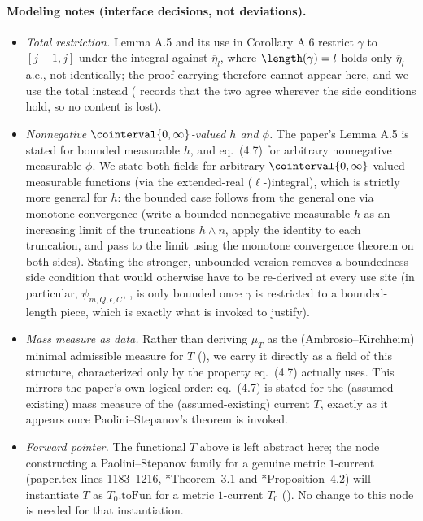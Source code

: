 \begin{definition}
  \paragraph{Modeling notes (interface decisions, not deviations).}
  \begin{itemize}
    \item \emph{Total restriction.} Lemma A.5 and its use in Corollary A.6 restrict $\gamma$ to
      $[j-1,j]$ under the integral against $\overline{\eta}_l$, where $\length(\gamma) = l$ holds
      only $\overline{\eta}_l$-a.e., not identically; the proof-carrying 
      therefore cannot appear here, and we use the total  instead
      ( records that the two agree wherever the side conditions
      hold, so no content is lost).
    \item \emph{Nonnegative $\cointerval{0,\infty}$-valued $h$ and $\phi$.} The paper's Lemma A.5 is
      stated for bounded measurable $h$, and eq.~(4.7) for arbitrary nonnegative measurable $\phi$.
      We state both fields for arbitrary $\cointerval{0,\infty}$-valued measurable functions (via
      the extended-real ($\ell$-)integral), which is strictly more general for $h$: the bounded case
      follows from the general one via monotone convergence (write a bounded nonnegative measurable
      $h$ as an increasing limit of the truncations $h \wedge n$, apply the identity to each
      truncation, and pass to the limit using the monotone convergence theorem on both sides).
      Stating the stronger, unbounded version removes a boundedness side condition that would
      otherwise have to be re-derived at every use site (in particular, $\psi_{m,Q,\epsilon,C}$,
      , is only bounded once $\gamma$ is restricted to a bounded-length piece, which is
      exactly what  is invoked to justify).
    \item \emph{Mass measure as data.} Rather than deriving $\mu_T$ as the (Ambrosio--Kirchheim)
      minimal admissible measure for $T$ (), we carry it directly as a
      field of this structure, characterized only by the property eq.~(4.7) actually uses. This
      mirrors the paper's own logical order: eq.~(4.7) is stated for the (assumed-existing) mass
      measure of the (assumed-existing) current $T$, exactly as it appears once Paolini--Stepanov's
      theorem is invoked.
    \item \emph{Forward pointer.} The functional $T$ above is left abstract here; the node
      constructing a Paolini--Stepanov family for a genuine metric $1$-current (paper.tex lines
      1183--1216, \cite{PS}*{Theorem~3.1} and \cite{PS}*{Proposition~4.2}) will instantiate $T$ as
      $T_0.\mathrm{toFun}$ for a metric $1$-current $T_0$ (). No change to
      this node is needed for that instantiation.
  \end{itemize}
\end{definition}
